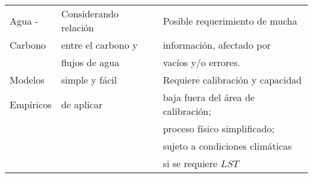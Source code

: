\begin{longtable}{l|l|l}
Agua -          & Considerando relación    & Posible requerimiento de mucha      \\
Carbono         & entre el carbono y       & información, afectado por           \\
                & flujos de agua           & vacíos y/o errores.                  \\ \hline
Modelos         & simple y fácil           & Requiere calibración y capacidad     \\
Empíricos       & de aplicar               & baja fuera del área de calibración; \\
                &                          & proceso físico simplificado;      \\
                &                          & sujeto a condiciones climáticas     \\
                &                          & si se requiere $LST$                   \\ \hline
\end{longtable}